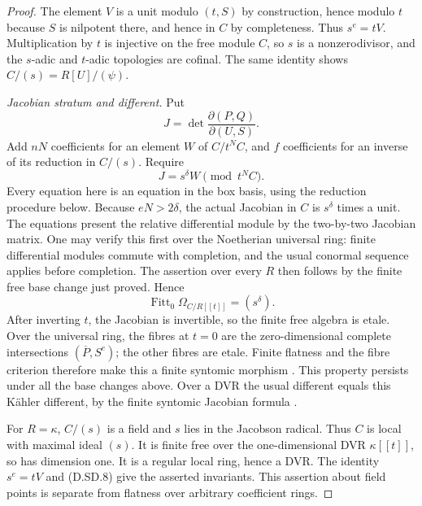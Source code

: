 \begin{proof}
The element $V$ is a unit modulo $(t,S)$ by construction,
hence modulo $t$ because $S$ is nilpotent there, and hence
in $C$ by completeness.  Thus $s^e=tV$.
Multiplication by $t$ is injective on the free module $C$,
so $s$ is a nonzerodivisor, and the $s$-adic and $t$-adic
topologies are cofinal.  The same identity shows
$C/(s)=R[U]/(\psi)$.

\emph{Jacobian stratum and different.}
Put
\[
                 J=\det\frac{\partial(P,Q)}{\partial(U,S)}.
                                                        \tag{D.SD.6}
\]
Add $nN$ coefficients for an element $W$ of $C/t^NC$, and
$f$ coefficients for an inverse of its reduction in $C/(s)$.
Require
\[
                         J=s^\delta W\pmod {t^NC}.
                                                        \tag{D.SD.7}
\]
Every equation here is an equation in the box basis, using
the reduction procedure below.  Because $eN>2\delta$,
the actual Jacobian in $C$ is $s^\delta$ times a unit.
The equations present the relative differential module by
the two-by-two Jacobian matrix.  One may verify this first
over the Noetherian universal ring: finite differential
modules commute with completion, and the usual conormal
sequence applies before completion.  The assertion over
every $R$ then follows by the finite free base change just proved.
Hence
\[
                  \operatorname{Fitt}_0\Omega_{C/R[[t]]}
                                      =(s^\delta).       \tag{D.SD.8}
\]
After inverting $t$, the Jacobian is invertible, so the
finite free algebra is etale.  Over the universal ring,
the fibres at $t=0$ are the zero-dimensional complete
intersections $(\overline P,S^e)$; the other fibres are etale.
Finite flatness and the fibre criterion therefore make this
a finite syntomic morphism
\citep[Lemma~49.11.1(3), Tag 0FKX]{StacksSparseDVRB}.
This property persists under all the base changes above.
Over a DVR the usual different equals this K\"ahler different,
by the finite syntomic Jacobian formula
\citep[Lemmas~49.12.1--49.12.3 and their proofs,
Tag 0BWB]{StacksSparseDVRB}.

For $R=\kappa$, $C/(s)$ is a field and $s$ lies in the Jacobson
radical.  Thus $C$ is local with maximal ideal $(s)$.
It is finite free over the one-dimensional DVR $\kappa[[t]]$,
so has dimension one.  It is a regular local ring, hence a DVR.
The identity $s^e=tV$ and (D.SD.8) give the asserted invariants.
This assertion about field points is separate from flatness
over arbitrary coefficient rings.


\end{proof}
